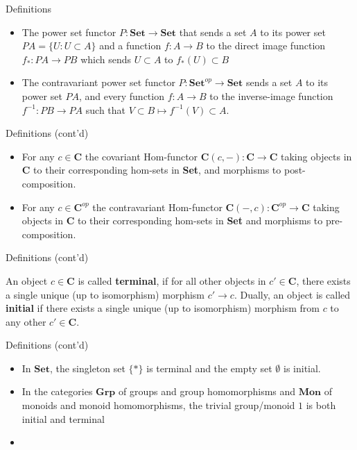 \documentclass[tikz]{beamer}
\theoremstyle{definition}
\newcommand{\cat}[1]{\mathbf{#1}}
\begin{document}
\begin{frame}{Definitions}

    \begin{itemize}
        \item The power set functor $P: \mathbf{Set} \to \mathbf{Set}$ that sends a set $A$ to its power set $PA = \{U : U \subset A\}$ and a function $f: A \to B$ to the direct image function $f_* : PA \to PB$ which sends $U \subset A$ to $f_*(U) \subset B$

        \item The contravariant power set functor $P: \mathbf{Set}^{op} \to \mathbf{Set}$ sends a set $A$ to its power set $PA$, and every function $f: A \to B$ to the inverse-image function $f^{-1}: PB \to PA$ such that $V \subset B \mapsto f^{-1}(V) \subset A$.
    \end{itemize}{}
\end{frame}{}

\begin{frame}{Definitions (cont'd)}

\begin{itemize}
    \item For any $c \in \mathbf{C}$ the covariant Hom-functor $\mathbf{C}(c, -): \mathbf{C} \to \mathbf{C}$ taking objects in $\mathbf{C}$ to their corresponding hom-sets in \textbf{Set}, and morphisms to post-composition.
    \item For any $c \in \mathbf{C}^{op}$ the contravariant Hom-functor $\mathbf{C}(-, c): \mathbf{C}^{op} \to \mathbf{C}$ taking objects in $\mathbf{C}$ to their corresponding hom-sets in \textbf{Set} and morphisms to pre-composition.
\end{itemize}{}
\end{frame}{}

\begin{frame}{Definitions (cont'd) }

\begin{definition}

An object $c \in \cat{C}$ is called \textbf{terminal}, if for all other objects in $c' \in \cat{C}$, there exists a single unique (up to isomorphism) morphism $c' \to c$. Dually, an object is called \textbf{initial} if there exists a single unique (up to isomorphism) morphism from $c$ to any other $c' \in \cat{C}$.
\end{definition}
\end{frame}

\begin{frame}{Definitions (cont'd) }

\begin{itemize}
	\item In $\cat{Set}$, the singleton set $\{*\}$ is terminal and the empty set $\emptyset$ is initial.
	\item In the categories $\cat{Grp}$ of groups and group homomorphisms and $\cat{Mon}$ of monoids and monoid homomorphisms, the trivial group/monoid $1$ is both initial and terminal
	\item
\end{itemize}
\end{frame}
\end{document}
